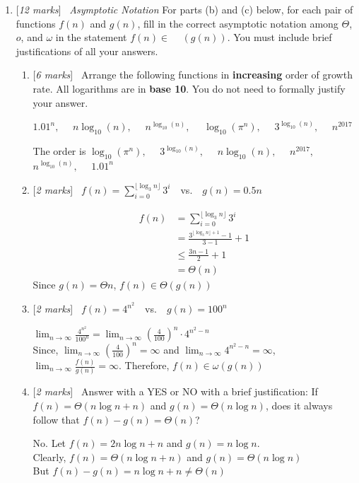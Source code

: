 \documentclass[11pt]{article}
\newcommand{\Q}[1]{\medskip\item {[{\em #1 marks\/}]}\ }
\begin{document}
\begin{enumerate}

\Q{12} {\em Asymptotic Notation } For parts (b) and (c) below, for each pair of functions $f(n)$ and $g(n)$, fill in the correct asymptotic notation among $\Theta$,
$o$, and $\omega$ in the statement $f(n)\in$ \verb*| | $(g(n))$.
You must include brief justifications of all your answers.

\begin{enumerate}
\Q{6} Arrange the following functions in \textbf{increasing} order of growth rate. All logarithms are in \textbf{base 10}. You do not need to formally justify your answer. %
\begin{center}
$1.01^n,\quad$ 
$n\log_{10}(n),\quad$ 
$n^{\log_{10}(n)},\quad$ 
$\log_{10}(\pi^n),\quad$ 
$3^{\log_{10}(n)},\quad$
$n^{2017}$
\end{center}

The order is
$\log_{10}(\pi^n),\quad$
$3^{\log_{10}(n)},\quad$
$n\log_{10}(n),\quad$
$n^{2017},\quad$
$n^{\log_{10}(n)},\quad$
$1.01^n$

\Q{2}  $f(n) = \sum_{i=0}^{\lfloor\log_3 n\rfloor} 3^i$\ \ vs.\ \ $g(n) = 0.5 n$

\begin{align*}
    f(n) & = \sum_{i=0}^{\lfloor\log_3 n\rfloor} 3^i \\
    & = \frac {3^{\lfloor \log_3 n \rfloor + 1} - 1} {3 - 1} + 1\\
    & \leq \frac {3n - 1} {2} + 1\\
    & = \Theta(n)
\end{align*}
Since $g(n) = \Theta n$, $f(n) \in \Theta(g(n))$
\Q{2} $f(n) = 4^{n^2}$\ \ vs.\ \ $g(n) = 100^n$

$\lim_{n \to \infty} \frac {4^{n^2}} {100^n} = \lim_{n \to \infty} (\frac {4} {100})^n \cdot 4^{n^2 - n}$\\
Since, $\lim_{n \to \infty} (\frac {4} {100})^n = \infty$ and $\lim_{n \to \infty} 4^{n^2 - n} = \infty$,
$\lim_{n \to \infty} \frac {f(n)} {g(n)} = \infty$. Therefore, $f(n) \in \omega(g(n))$

\Q{2} Answer with a YES or NO with a brief justification: If $f(n)=\Theta(n\log n + n)$ and $g(n)=\Theta(n\log n)$,
does it always follow that $f(n)-g(n)=\Theta(n)$? 

No. Let $f(n) = 2n \log n + n$ and $g(n) = n \log n$.\\
Clearly, $f(n) = \Theta (n \log n + n)$ and $g(n) = \Theta(n \log n)$\\
But $f(n) - g(n) = n \log n + n \neq \Theta(n)$


\end{enumerate}
\end{enumerate}
\end{document}

